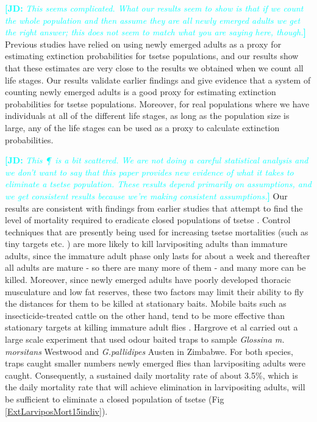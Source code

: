 \documentclass[smallextended]{svjour3}
\newcommand{\comment}[3]{\textcolor{#1}{\textbf{[#2: }\textit{#3}\textbf{]}}}
\newcommand{\jd}[1]{\comment{cyan}{JD}{#1}}
\begin{document}
\jd{This seems complicated. What our results seem to show is that if we count the whole population and then assume they are all newly emerged adults we get the right answer; this does not seem to match what you are saying here, though.}
Previous studies have relied on using newly emerged adults as a proxy for estimating extinction probabilities for tsetse populations, and our results show that these estimates are very close to the results we obtained when we count all life stages. Our results validate earlier findings and give evidence that a system of counting newly emerged adults is a good proxy for estimating extinction probabilities for tsetse populations. Moreover, for real populations where we have individuals at all of the different life stages, as long as the population size is large, any of the life stages can be used as a proxy to calculate extinction probabilities. 

\jd{This \P\ is a bit scattered. We are not doing a careful statistical analysis and we don't want to say that this paper provides new evidence of what it takes to eliminate a tsetse population. These results depend primarily on assumptions, and we get consistent results because we're making consistent assumptions.}
Our results are consistent with findings from earlier studies that attempt to find the level of mortality required to eradicate closed populations of tsetse \cite{Hargrove2005a,Kajunguri2019}. Control techniques that are presently being used for increasing tsetse mortalities (such as tiny targets etc. \cite{Hargrove2000,Esterhuizen2006,Shaw2015,Mbewe2018a}) are more likely to kill larvipositing adults than immature adults, since the immature adult phase only lasts for  about a week and thereafter all adults are mature - so there are many more of them - and many more can be killed. Moreover, since newly emerged adults have poorly developed thoracic musculature and low fat reserves, these two factors may limit their ability to fly the distances for them to be killed at stationary baits. Mobile baits such as insecticide-treated cattle on the other hand, tend to be more effective than stationary targets at killing immature adult flies \cite{Hargrove1991}. Hargrove et al \cite{HargroveJ.W.Holloway} carried out a large scale experiment that used  odour baited traps to sample  {\it Glossina m. morsitans} Westwood and {\it G.pallidipes} Austen in Zimbabwe. For both species, traps caught smaller numbers newly emerged flies than larvipositing adults were caught. Consequently, a sustained daily mortality rate of about 3.5\%, which is the daily mortality rate that will achieve elimination in larvipositing adults, will be sufficient to eliminate a closed population of tsetse (Fig \ref{ExtLarviposMort15indiv}).
\end{document}
